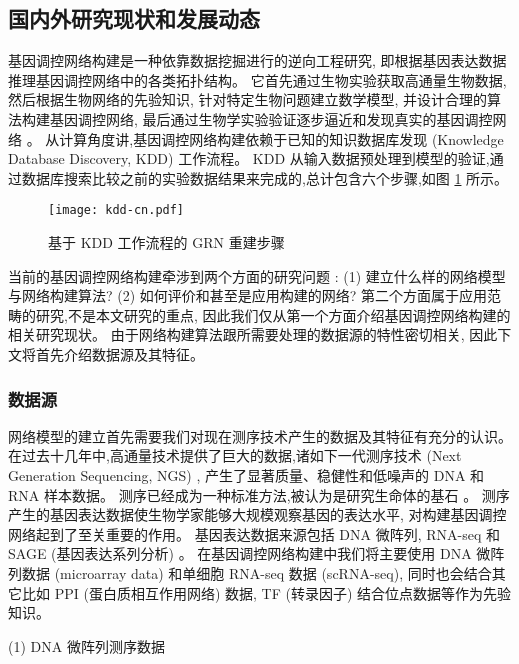 \subsection{国内外研究现状和发展动态}

基因调控网络构建是一种依靠数据挖掘进行的逆向工程研究, 即根据基因表达数据推理基因调控网络中的各类拓扑结构。
它首先通过生物实验获取高通量生物数据, 然后根据生物网络的先验知识, 针对特定生物问题建立数学模型, 
并设计合理的算法构建基因调控网络, 最后通过生物学实验验证逐步逼近和发现真实的基因调控网络 。
从计算角度讲,基因调控网络构建依赖于已知的知识数据库发现 (Knowledge Database Discovery, KDD) 工作流程。
KDD 从输入数据预处理到模型的验证,通过数据库搜索比较之前的实验数据结果来完成的,总计包含六个步骤,如图 \ref{cover-3} 所示。
\begin{figure}[!htbp]
    \centering
    \texttt{[image: kdd-cn.pdf]}
    \caption{基于 KDD 工作流程的 GRN 重建步骤}
    \label{cover-3}
\end{figure}

当前的基因调控网络构建牵涉到两个方面的研究问题 :
(1) 建立什么样的网络模型与网络构建算法?
(2) 如何评价和甚至是应用构建的网络?
第二个方面属于应用范畴的研究,不是本文研究的重点, 因此我们仅从第一个方面介绍基因调控网络构建的相关研究现状。
由于网络构建算法跟所需要处理的数据源的特性密切相关, 因此下文将首先介绍数据源及其特征。

\subsubsection{数据源}

网络模型的建立首先需要我们对现在测序技术产生的数据及其特征有充分的认识。
在过去十几年中,高通量技术提供了巨大的数据,诸如下一代测序技术 (Next Generation Sequencing, NGS) , 
产生了显著质量、稳健性和低噪声的 DNA 和 RNA 样本数据。
测序已经成为一种标准方法,被认为是研究生命体的基石 。
测序产生的基因表达数据使生物学家能够大规模观察基因的表达水平, 对构建基因调控网络起到了至关重要的作用。
基因表达数据来源包括 DNA 微阵列, RNA-seq 和 SAGE (基因表达系列分析) 。
在基因调控网络构建中我们将主要使用 DNA 微阵列数据 (microarray data) 和单细胞 RNA-seq 数据 (scRNA-seq),
同时也会结合其它比如 PPI (蛋白质相互作用网络) 数据, TF (转录因子) 结合位点数据等作为先验知识。

(1) DNA 微阵列测序数据

